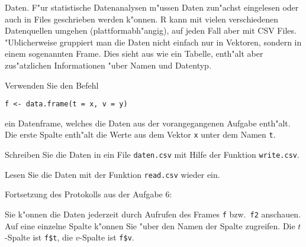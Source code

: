 Daten. F"ur statistische Datenanalysen m"ussen Daten zun"achst eingelesen
oder auch in Files geschrieben werden k"onnen.
R kann mit vielen verschiedenen Datenquellen umgehen
(plattformabh"angig), auf jeden Fall aber mit CSV Files.
"Ublicherweise gruppiert man die Daten nicht einfach nur in Vektoren, sondern
in einem sogenannten Frame. Dies sieht aus wie ein Tabelle, enth"alt aber
zus"atzlichen Informationen "uber Namen und Datentyp.
\begin{teilaufgaben}
\item Verwenden Sie den Befehl
\begin{verbatim}
f <- data.frame(t = x, v = y)
\end{verbatim}
ein Datenframe, welches die Daten aus der vorangegangenen
Aufgabe enth"alt. Die erste Spalte enth"alt die Werte aus dem Vektor
{\tt x} unter dem Namen {\tt t}.
\item Schreiben Sie die Daten in ein File {\tt daten.csv} mit Hilfe der
Funktion {\tt write.csv}.
\item Lesen Sie die Daten mit der Funktion {\tt read.csv} wieder ein.
\end{teilaufgaben}

\begin{loesung}
Fortsetzung des Protokolls aus der Aufgabe 6:

Sie k"onnen die Daten jederzeit durch Aufrufen des Frames {\tt f}
bzw.~{\tt f2} anschauen. Auf eine einzelne Spalte k"onnen Sie "uber
den Namen der Spalte zugreifen. Die $t$-Spalte ist {\tt f\$t},
die $v$-Spalte ist {\tt f\$v}.
\end{loesung}


